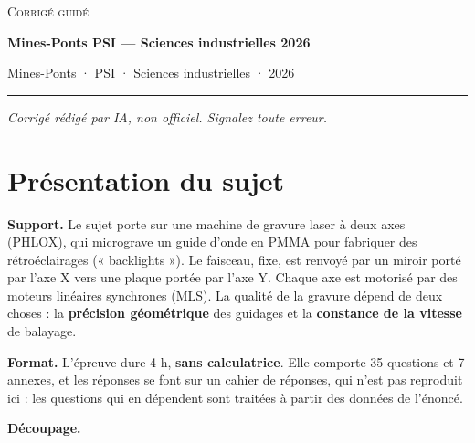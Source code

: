 \documentclass[11pt,a4paper]{article}
\begin{document}
\thispagestyle{plain}
\begin{center}
  {\small\scshape Corrigé guidé}\par\smallskip
  {\LARGE\bfseries Mines-Ponts PSI — Sciences industrielles 2026\par}\medskip
  {\large Mines-Ponts · PSI · Sciences industrielles · 2026\par}
\end{center}
\vspace{2pt}\hrule\vspace{8pt}

\emph{Corrigé rédigé par IA, non officiel. Signalez toute erreur.}

\hypertarget{pruxe9sentation-du-sujet}{%
\section{Présentation du sujet}\label{pruxe9sentation-du-sujet}}

\textbf{Support.} Le sujet porte sur une machine de gravure laser à deux axes (PHLOX), qui micrograve un guide d'onde en PMMA pour fabriquer des rétroéclairages (« backlights »). Le faisceau, fixe, est renvoyé par un miroir porté par l'axe X vers une plaque portée par l'axe Y. Chaque axe est motorisé par des moteurs linéaires synchrones (MLS). La qualité de la gravure dépend de deux choses : la \textbf{précision géométrique} des guidages et la \textbf{constance de la vitesse} de balayage.

\textbf{Format.} L'épreuve dure 4 h, \textbf{sans calculatrice}. Elle comporte 35 questions et 7 annexes, et les réponses se font sur un cahier de réponses, qui n'est pas reproduit ici : les questions qui en dépendent sont traitées à partir des données de l'énoncé.

\textbf{Découpage.}
\end{document}
